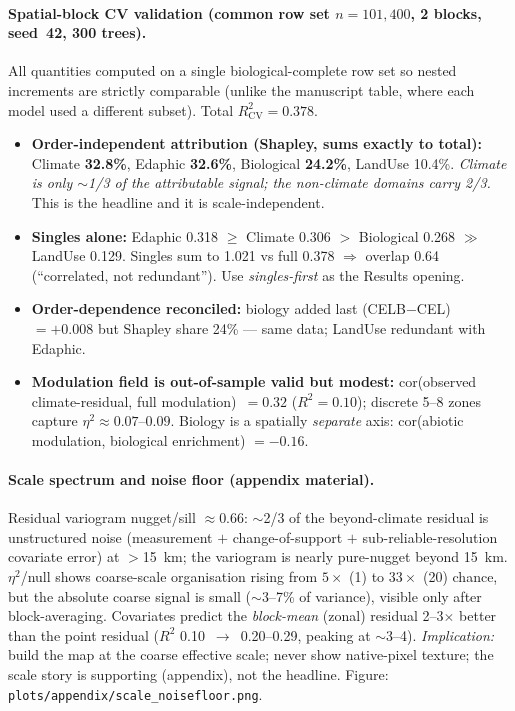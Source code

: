 \documentclass[11pt,a4paper]{article}
\begin{document}
\paragraph{Spatial-block CV validation (common row set $n=101{,}400$, 2\textdegree{}
blocks, seed~42, 300 trees).} All quantities computed on a single biological-complete
row set so nested increments are strictly comparable (unlike the manuscript table,
where each model used a different subset). Total $R^2_\text{CV}=0.378$.
\begin{itemize}\itemsep2pt
  \item \textbf{Order-independent attribution (Shapley, sums exactly to total):}
  Climate \textbf{32.8\%}, Edaphic \textbf{32.6\%}, Biological \textbf{24.2\%},
  LandUse 10.4\%. \emph{Climate is only $\sim$1/3 of the attributable signal; the
  non-climate domains carry 2/3.} This is the headline and it is scale-independent.
  \item \textbf{Singles alone:} Edaphic 0.318 $\ge$ Climate 0.306 $>$ Biological
  0.268 $\gg$ LandUse 0.129. Singles sum to 1.021 vs full 0.378 $\Rightarrow$
  overlap 0.64 (``correlated, not redundant''). Use \emph{singles-first} as the
  Results opening.
  \item \textbf{Order-dependence reconciled:} biology added last (CELB$-$CEL)
  $=+0.008$ but Shapley share 24\% --- same data; LandUse redundant with Edaphic.
  \item \textbf{Modulation field is out-of-sample valid but modest:}
  cor(observed climate-residual, full modulation)~$=0.32$ ($R^2=0.10$); discrete
  5--8 zones capture $\eta^2\approx0.07$--$0.09$. Biology is a spatially
  \emph{separate} axis: cor(abiotic modulation, biological enrichment) $=-0.16$.
\end{itemize}

\paragraph{Scale spectrum and noise floor (appendix material).} Residual variogram
nugget/sill $\approx\mathbf{0.66}$: $\sim$2/3 of the beyond-climate residual is
unstructured noise (measurement $+$ change-of-support $+$ sub-reliable-resolution
covariate error) at $>$15~km; the variogram is nearly pure-nugget beyond 15~km.
$\eta^2$/null shows coarse-scale organisation rising from $5\times$ (1\textdegree)
to $33\times$ (20\textdegree) chance, but the absolute coarse signal is small
($\sim$3--7\% of variance), visible only after block-averaging. Covariates predict
the \emph{block-mean} (zonal) residual 2--3$\times$ better than the point residual
($R^2$ 0.10~$\to$~0.20--0.29, peaking at $\sim$3--4\textdegree). \emph{Implication:}
build the map at the coarse effective scale; never show native-pixel texture; the
scale story is supporting (appendix), not the headline. Figure:
\texttt{plots/appendix/scale\_noisefloor.png}.
\end{document}

